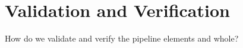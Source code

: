  
\section{Validation and Verification}

How do we validate and verify the pipeline elements and whole?

%



